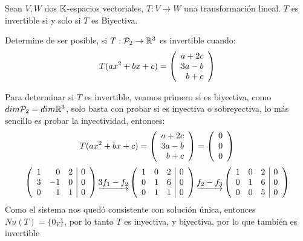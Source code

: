 \begin{theorem}
Sean $V,W$ dos $\dobleK$-espacios vectoriales, $T: V \to W$ una transformación lineal. $T$ es invertible si y solo si $T$ es Biyectiva.\\
\end{theorem}



\begin{ejemplo}
Determine de ser posible, si $T: \pdos \to \rtres$ es invertible cuando:
$$T(ax^2 + bx + c) = \vectrtres{a+2c}{3a-b}{b+c}$$
\end{ejemplo}

\begin{sol}
    Para determinar si $T$ es invertible, veamos primero si es biyectiva, como $dim\pdos = dim\rtres$, solo basta con probar si es inyectiva o sobreyectiva, lo más sencillo es probar la inyectividad, entonces:
    $$T(ax^2 + bx + c) = \vectrtres{a+2c}{3a-b}{b+c} = \vectrtres{0}{0}{0}$$
    $$\reducir{rrr|r}{
        1&0&2&0\\
        3&-1&0&0\\
        0&1&1&0
    }\underrightarrow{3f_1 - f_2}
    \reducir{rrr|r}{
        1&0&2&0\\
        0&1&6&0\\
        0&1&1&0
    }\underrightarrow{f_2 - f_3}
    \reducir{rrr|r}{
        1&0&2&0\\
        0&1&6&0\\
        0&0&5&0
    }$$
    Como el sistema nos quedó consistente con solución única, entonces $Nu(T) = \{0_V\}$, por lo tanto $T$ es inyectiva, y biyectiva, por lo que también es invertible
\end{sol}

